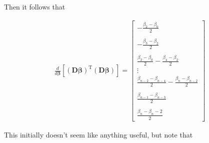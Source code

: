\documentclass{article}
\newcommand{\B}{\boldsymbol\beta} %
\newcommand{\D}{\mathbf{D}}
\begin{document}
Then it follows that 

\begin{align*}
\frac{d}{d\B} \left[ (\D\B)^{\textrm{T}}(\D\B) \right] = 
\begin{bmatrix}
- \frac{\beta_2 - \beta_0}{2} \\\\
- \frac{\beta_3 - \beta_2}{2} \\\\
\frac{\beta_2 - \beta_0}{2} - \frac{\beta_4 - \beta_2}{2}\\
\vdots \\
\frac{\beta_{n-2} - \beta_{n-4}}{2} - \frac{\beta_n - \beta_{n-2}}{2}\\\\
\frac{\beta_{n-1} - \beta_{n-3}}{2} \\\\
\frac{\beta_n - \beta_n-2}{2}
\end{bmatrix}
\end{align*}

This initially doesn't seem like anything useful, but note that
\end{document}
